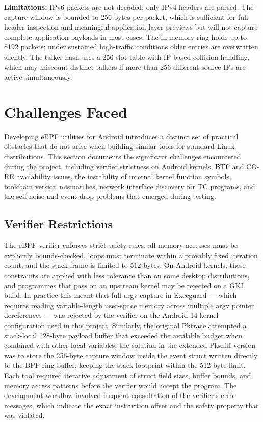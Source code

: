 \documentclass{mnitjaipur}
\begin{document}
\textbf{Limitations:} IPv6 packets are not decoded; only IPv4 headers are parsed. The capture window is bounded to 256 bytes per packet, which is sufficient for full header inspection and meaningful application-layer previews but will not capture complete application payloads in most cases. The in-memory ring holds up to 8192 packets; under sustained high-traffic conditions older entries are overwritten silently. The talker hash uses a 256-slot table with IP-based collision handling, which may miscount distinct talkers if more than 256 different source IPs are active simultaneously.

\clearpage
\chapter{Challenges Faced}
Developing eBPF utilities for Android introduces a distinct set of practical obstacles that do not arise when building similar tools for standard Linux distributions. This section documents the significant challenges encountered during the project, including verifier strictness on Android kernels, BTF and CO-RE availability issues, the instability of internal kernel function symbols, toolchain version mismatches, network interface discovery for TC programs, and the self-noise and event-drop problems that emerged during testing.

\section{Verifier Restrictions}
The eBPF verifier enforces strict safety rules: all memory accesses must be explicitly bounds-checked, loops must terminate within a provably fixed iteration count, and the stack frame is limited to 512 bytes. On Android kernels, these constraints are applied with less tolerance than on some desktop distributions, and programmes that pass on an upstream kernel may be rejected on a GKI build. In practice this meant that full argv capture in Execguard — which requires reading variable-length user-space memory across multiple argv pointer dereferences — was rejected by the verifier on the Android 14 kernel configuration used in this project. Similarly, the original Pktrace attempted a stack-local 128-byte payload buffer that exceeded the available budget when combined with other local variables; the solution in the extended Pksniff version was to store the 256-byte capture window inside the event struct written directly to the BPF ring buffer, keeping the stack footprint within the 512-byte limit. Each tool required iterative adjustment of struct field sizes, buffer bounds, and memory access patterns before the verifier would accept the program. The development workflow involved frequent consultation of the verifier's error messages, which indicate the exact instruction offset and the safety property that was violated.
\end{document}

